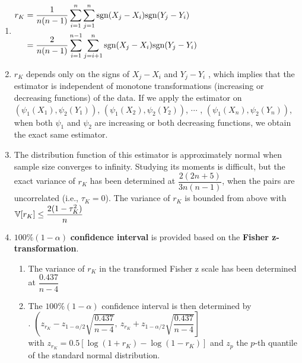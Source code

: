 \begin{enumerate}
    \item 
    $
        \begin{aligned}
            r_K
            &= \dfrac{1}{n(n - 1)} \displaystyle\sum^n _{i=1} \displaystyle\sum^n _{j=1} \text{sgn}(X_j - X_i )\text{sgn}(Y_j - Y_i )\\
            &= \dfrac{2}{n(n - 1)} \displaystyle\sum^{n-1}_{i=1} \displaystyle\sum^n  _{j=i+1} \text{sgn}(X_j - X_i )\text{sgn}(Y_j - Y_i )
        \end{aligned}
    $
    \hfill \cite{statistics/book/Statistics-for-Data-Scientists/Maurits-Kaptein}

    \item  $r_K$ depends only on the signs of $X_j - X_i$ and $Y_j - Y_i$ , which implies that the estimator is independent of monotone transformations (increasing or decreasing functions) of the data.
    If we apply the estimator on $(\psi_1(X_1), \psi_2(Y_1))$, $(\psi_1(X_2), \psi_2(Y_2))$, $\cdots$ , $(\psi_1(X_n ), \psi_2(Y_n ))$, when both $\psi_1$ and $\psi_2$ are increasing or both decreasing functions, we obtain the exact same estimator.
    \hfill \cite{statistics/book/Statistics-for-Data-Scientists/Maurits-Kaptein}

    \item The distribution function of this estimator is approximately normal when sample size converges to infinity. 
    Studying its moments is difficult, but the exact variance of $r_K$ has been determined at $\dfrac{2(2n + 5)}{3n(n - 1)}$, when the pairs are uncorrelated (i.e., $\tau_K = 0$). 
    The variance of $r_K$ is bounded from above with $\mathbb{V}[r_K] \leq \dfrac{2(1 - \tau^2_K )}{n}$ 
    \hfill \cite{statistics/book/Statistics-for-Data-Scientists/Maurits-Kaptein}

    \item  $100\%(1 - \alpha)$ \textbf{confidence interval} is provided based on the \textbf{Fisher z-transformation}.
    \hfill \cite{statistics/book/Statistics-for-Data-Scientists/Maurits-Kaptein}
    \begin{enumerate}
        \item The variance of $r_K$ in the transformed Fisher z scale has been determined at $\dfrac{0.437}{n - 4}$
        \hfill \cite{statistics/book/Statistics-for-Data-Scientists/Maurits-Kaptein}

        \item The $100\%(1 - \alpha)$ confidence interval is then determined by
        \hfill \cite{statistics/book/Statistics-for-Data-Scientists/Maurits-Kaptein}
        \\[0.3cm]
        .\hfill
        $
            \left(
                z_{r_K} - z_{1-\alpha/2} \sqrt{\dfrac{0.437}{n - 4}},
                \ z_{r_K} + z_{1-\alpha/2} \sqrt{\dfrac{0.437}{n - 4}}
            \right]
        $
        \hfill \cite{statistics/book/Statistics-for-Data-Scientists/Maurits-Kaptein}
        \\[0.3cm]
        with $z_{r_K} = 0.5[\log(1 + r_K ) - \log(1 - r_K )]$ and $z_p$ the $p$-th quantile of the standard normal distribution.
        \hfill \cite{statistics/book/Statistics-for-Data-Scientists/Maurits-Kaptein}


\end{enumerate}
\end{enumerate}
